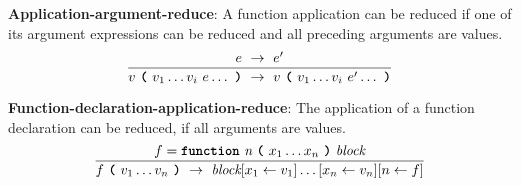 \vspace{10mm}
\textbf{Application-argument-reduce}: A function application
can be reduced if one of its argument expressions can be reduced and all
preceding arguments are values.
\[
\frac{
  e \ \rightarrow \ e'
}{
  v\  \textbf{\texttt{(}}\ v_1 \ldots v_i \ e \ldots\ \textbf{\texttt{)}}
  \ \rightarrow \ 
  v\  \textbf{\texttt{(}}\ v_1 \ldots v_i \ e' \ldots\ \textbf{\texttt{)}}
}
\]



\vspace{10mm}
\textbf{Function-declaration-application-reduce}:
The application of a function declaration
can be reduced, if all
arguments are values. 
\[
\frac{
  f = \textbf{\texttt{function}}\  \textit{n} \ 
                 \textbf{\texttt{(}}\  x_1 \ldots x_n
                 \ \textbf{\texttt{)}}\ \textit{block}
}{
  f\ \textbf{\texttt{(}}\ v_1 \ldots v_n\ \textbf{\texttt{)}}
  \ \rightarrow \ 
  \textit{block} [x_1 \leftarrow v_1]\ldots[x_n \leftarrow v_n]
  [n \leftarrow f]
}
\]


    
